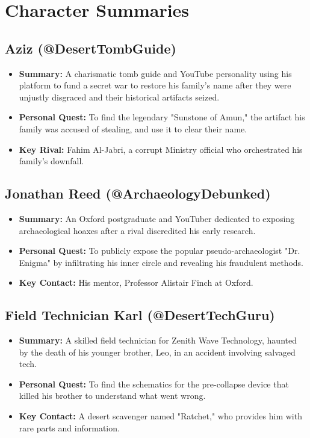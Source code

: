 \documentclass[10pt, a4paper]{article}
\begin{document}
\section*{Character Summaries}

\subsection*{Aziz (@DesertTombGuide)}
\begin{itemize}
    \item \textbf{Summary:} A charismatic tomb guide and YouTube personality using his platform to fund a secret war to restore his family's name after they were unjustly disgraced and their historical artifacts seized.
    \item \textbf{Personal Quest:} To find the legendary "Sunstone of Amun," the artifact his family was accused of stealing, and use it to clear their name.
    \item \textbf{Key Rival:} Fahim Al-Jabri, a corrupt Ministry official who orchestrated his family's downfall.
\end{itemize}

\subsection*{Jonathan Reed (@ArchaeologyDebunked)}
\begin{itemize}
    \item \textbf{Summary:} An Oxford postgraduate and YouTuber dedicated to exposing archaeological hoaxes after a rival discredited his early research.
    \item \textbf{Personal Quest:} To publicly expose the popular pseudo-archaeologist "Dr. Enigma" by infiltrating his inner circle and revealing his fraudulent methods.
    \item \textbf{Key Contact:} His mentor, Professor Alistair Finch at Oxford.
\end{itemize}

\subsection*{Field Technician Karl (@DesertTechGuru)}
\begin{itemize}
    \item \textbf{Summary:} A skilled field technician for Zenith Wave Technology, haunted by the death of his younger brother, Leo, in an accident involving salvaged tech.
    \item \textbf{Personal Quest:} To find the schematics for the pre-collapse device that killed his brother to understand what went wrong.
    \item \textbf{Key Contact:} A desert scavenger named "Ratchet," who provides him with rare parts and information.
\end{itemize}
\end{document}
